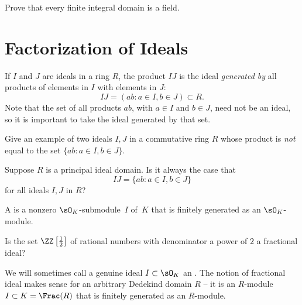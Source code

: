 \begin{exercise}\label{ex:finitedomain}
  Prove that every finite integral domain is a field.
\end{exercise}

\section{Factorization of Ideals}

If $I$ and $J$ are ideals in a ring $R$, the product $IJ$ is the ideal
{\em generated by} all products of elements in $I$ with elements in $J$:
$$
  IJ = (ab : a\in I, b\in J) \subset R.
$$
Note that the set of all products $ab$, with $a\in I$ and $b\in J$,
need not be an ideal, so it is important to take the ideal generated
by that set.

\begin{exercise}\label{ex:idealprod}
  Give an example of two ideals $I, J$ in a commutative
  ring $R$ whose product is {\em not} equal to the set
  $\{ab : a \in I, b \in J\}$.
\end{exercise}

\begin{exercise}\label{ex:idealprod2}
  Suppose $R$ is a principal ideal domain. Is it always the case that
  $$
    IJ = \{ab : a \in I, b \in J\}
  $$
  for all ideals $I, J$ in $R$?
\end{exercise}


\begin{definition}\label{def:fracideal}
  A  is a nonzero $\sO_K$-submodule~$I$ of~$K$ that
  is finitely generated as an $\sO_K$-module.
\end{definition}

\begin{exercise}
  Is the set $\ZZ\left[\frac{1}{2}\right]$ of rational numbers with
  denominator a power of $2$ a fractional ideal?
\end{exercise}

We will sometimes call a genuine ideal $I\subset \sO_K$ an
.  The notion of fractional ideal makes
sense for an arbitrary Dedekind domain $R$ -- it is an
$R$-module $I\subset K=\Frac(R)$ that is finitely
generated as an $R$-module.

